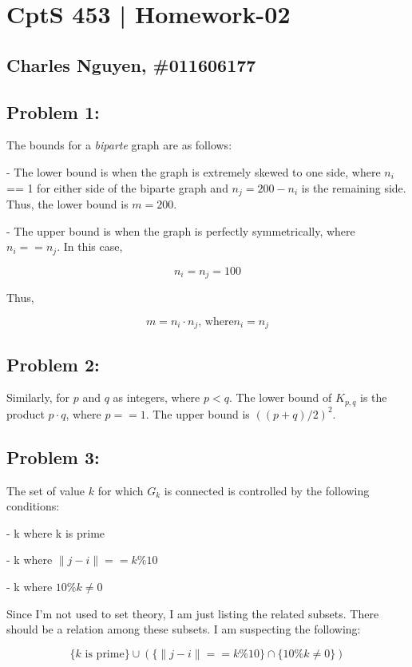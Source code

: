 \documentclass[12pt,letterpaper]{article}
\begin{document}
\section*{CptS 453 | Homework-02 }
\subsection*{Charles Nguyen, \#011606177 }

\subsection*{Problem 1:}

The bounds for a \emph{biparte} graph are as follows:

- The lower bound is when the graph is extremely skewed to one side, where
$n_i$ == 1 for either side of the biparte graph and $n_j = 200 - n_i $ is the
remaining side. Thus, the lower bound is $m = 200$.

- The upper bound is when the graph is perfectly symmetrically, where $n_i ==
n_j$. In this case,

\[n_i = n_j = 100 \]

Thus,

\[ m = n_i \cdot n_j \mbox{, where} n_i = n_j \]

\subsection*{Problem 2:}

Similarly, for $p$ and $q$ as integers, where $p < q$. The lower bound of
$K_{p,q}$ is the product $p \cdot q$, where $p == 1$.  The upper bound is $((p
+ q) / 2)^2$.

\pagebreak

\subsection*{Problem 3:}

The set of value $k$ for which $G_k$ is connected is controlled by the
following conditions:

- k where k is prime

- k where $\|j - i\| == k \% 10$

- k where $10 \% k \neq 0$

Since I'm not used to set theory, I am just listing the related subsets. There
should be a relation among these subsets. I am suspecting the following:

\[ \{k \mbox{ is prime}\} \cup (\{\|j-i\| == k\%10\} \cap \{10\%k \neq 0\}) \]
\end{document}
